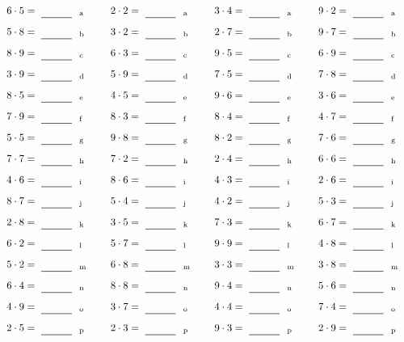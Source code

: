 \documentclass
[
  draft    = true,
  fontsize = 11pt,
  parskip  = half-
]
{scrartcl}
\begin{document}
\par\vfill\par
\begin{align*}
    \pline{6\cdot5}&=\rline{a}
  & \pline{2\cdot2}&=\rline{a}
  & \pline{3\cdot4}&=\rline{a}
  & \pline{9\cdot2}&=\rline{a} \\[1ex]
    \pline{5\cdot8}&=\rline{b}
  & \pline{3\cdot2}&=\rline{b}
  & \pline{2\cdot7}&=\rline{b}
  & \pline{9\cdot7}&=\rline{b} \\[1ex]
    \pline{8\cdot9}&=\rline{c}
  & \pline{6\cdot3}&=\rline{c}
  & \pline{9\cdot5}&=\rline{c}
  & \pline{6\cdot9}&=\rline{c} \\[1ex]
    \pline{3\cdot9}&=\rline{d}
  & \pline{5\cdot9}&=\rline{d}
  & \pline{7\cdot5}&=\rline{d}
  & \pline{7\cdot8}&=\rline{d} \\[1ex]
    \pline{8\cdot5}&=\rline{e}
  & \pline{4\cdot5}&=\rline{e}
  & \pline{9\cdot6}&=\rline{e}
  & \pline{3\cdot6}&=\rline{e} \\[1ex]
    \pline{7\cdot9}&=\rline{f}
  & \pline{8\cdot3}&=\rline{f}
  & \pline{8\cdot4}&=\rline{f}
  & \pline{4\cdot7}&=\rline{f} \\[1ex]
    \pline{5\cdot5}&=\rline{g}
  & \pline{9\cdot8}&=\rline{g}
  & \pline{8\cdot2}&=\rline{g}
  & \pline{7\cdot6}&=\rline{g} \\[1ex]
    \pline{7\cdot7}&=\rline{h}
  & \pline{7\cdot2}&=\rline{h}
  & \pline{2\cdot4}&=\rline{h}
  & \pline{6\cdot6}&=\rline{h} \\[1ex]
    \pline{4\cdot6}&=\rline{i}
  & \pline{8\cdot6}&=\rline{i}
  & \pline{4\cdot3}&=\rline{i}
  & \pline{2\cdot6}&=\rline{i} \\[1ex]
    \pline{8\cdot7}&=\rline{j}
  & \pline{5\cdot4}&=\rline{j}
  & \pline{4\cdot2}&=\rline{j}
  & \pline{5\cdot3}&=\rline{j} \\[1ex]
    \pline{2\cdot8}&=\rline{k}
  & \pline{3\cdot5}&=\rline{k}
  & \pline{7\cdot3}&=\rline{k}
  & \pline{6\cdot7}&=\rline{k} \\[1ex]
    \pline{6\cdot2}&=\rline{l}
  & \pline{5\cdot7}&=\rline{l}
  & \pline{9\cdot9}&=\rline{l}
  & \pline{4\cdot8}&=\rline{l} \\[1ex]
    \pline{5\cdot2}&=\rline{m}
  & \pline{6\cdot8}&=\rline{m}
  & \pline{3\cdot3}&=\rline{m}
  & \pline{3\cdot8}&=\rline{m} \\[1ex]
    \pline{6\cdot4}&=\rline{n}
  & \pline{8\cdot8}&=\rline{n}
  & \pline{9\cdot4}&=\rline{n}
  & \pline{5\cdot6}&=\rline{n} \\[1ex]
    \pline{4\cdot9}&=\rline{o}
  & \pline{3\cdot7}&=\rline{o}
  & \pline{4\cdot4}&=\rline{o}
  & \pline{7\cdot4}&=\rline{o} \\[1ex]
    \pline{2\cdot5}&=\rline{p}
  & \pline{2\cdot3}&=\rline{p}
  & \pline{9\cdot3}&=\rline{p}
  & \pline{2\cdot9}&=\rline{p}
\end{align*}
\end{document}
